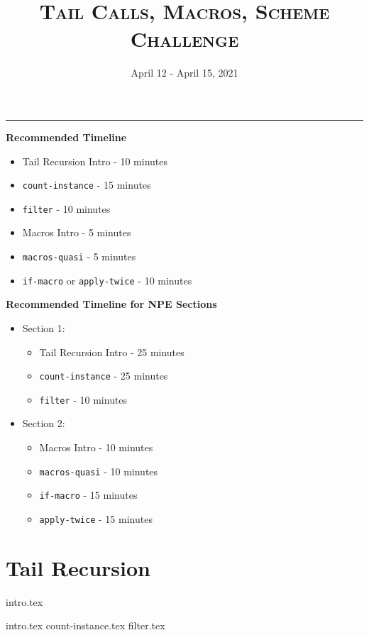 \documentclass{exam}
\title{\textsc{Tail Calls, Macros, Scheme Challenge}}
\date{April 12 - April 15, 2021}
\begin{document}
\maketitle
\rule{\textwidth}{0.15em}
\fontsize{12}{15}\selectfont

\begin{guide}
\begin{blocksection}
    \textbf{Recommended Timeline}
    \begin{itemize}
        \item Tail Recursion Intro - 10 minutes
        \item \lstinline{count-instance} - 15 minutes
        \item \lstinline{filter} - 10 minutes
        \item Macros Intro - 5 minutes
        \item \lstinline{macros-quasi} - 5 minutes
        \item \lstinline{if-macro} or \lstinline{apply-twice} - 10 minutes
    \end{itemize}
    \vspace{.5cm}
    \textbf{Recommended Timeline for NPE Sections}
    \begin{itemize}
        \item Section 1:
            \begin{itemize}
                \item Tail Recursion Intro - 25 minutes
                \item \lstinline{count-instance} - 25 minutes
                \item \lstinline{filter} - 10 minutes
            \end{itemize}
        \item Section 2:
            \begin{itemize}
                \item Macros Intro - 10 minutes
                \item \lstinline{macros-quasi} - 10 minutes
                \item \lstinline{if-macro} - 15 minutes
                \item \lstinline{apply-twice} - 15 minutes
            \end{itemize}
    \end{itemize}
\end{blocksection}
\newpage
\end{guide}

\section{Tail Recursion}
{intro.tex}
\begin{questions}
{intro.tex}
{count-instance.tex}
{filter.tex}
\end{questions}
\end{document}
